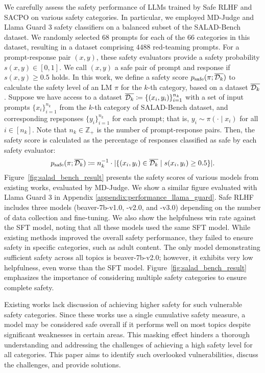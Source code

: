 We carefully assess the safety performance of LLMs trained by Safe RLHF and SACPO on various safety categories. In particular, we employed MD-Judge and Llama Guard 3 safety classifiers on a balanced subset of the SALAD-Bench dataset. We randomly selected $68$ prompts for each of the $66$ categories in this dataset, resulting in a dataset comprising $4488$ red-teaming prompts. For a prompt-response pair $(x, y)$, these safety evaluators provide a safety probability $s(x, y) \in [0, 1]$.
We call $(x, y)$ a safe pair of prompt and response if $s(x, y) \ge 0.5$ holds.
In this work, we define a safety score $p_\text{safe}(\pi; \overline{\mathcal{D}_k})$ to calculate the safety level of an LM $\pi$ for the $k$-th category, based on a dataset $\overline{\mathcal{D}_k}$.
Suppose we have access to a dataset $\overline{\mathcal{D}_k} \coloneqq \{(x_i, y_i)\}_{i=1}^{n_k}$ with a set of input prompts $\{x_i\}_{i=1}^{n_k}$ from the $k$-th category of SALAD-Bench dataset, and corresponding repsponses $\{y_i\}_{i=1}^{n_k}$ for each prompt; that is, $y_i \sim \pi(\cdot \mid x_i)$ for all $i \in [n_k]$.
Note that $n_k \in \mathbb{Z}_+$ is the number of prompt-response pairs.
Then, the safety score is calculated as the percentage of responses classified as safe by each safety evaluator:
%
\begin{equation*}
    p_\text{safe}(\pi; \overline{\mathcal{D}_k}) \coloneqq n_k^{-1} \cdot |\{(x_i, y_i) \in \overline{\mathcal{D}_k} \mid s(x_i, y_i) \ge 0.5\}|.
\end{equation*}
%
Figure~\ref{fig:salad_bench_result} presents the safety scores of various models from existing works, evaluated by MD-Judge. We show a similar figure evaluated with Llama Guard 3 in Appendix \ref{appendix:performance_llama_guard}. Safe RLHF includes three models (beaver-7b-v1.0, -v2.0, and -v3.0) depending on the number of data collection and fine-tuning. We also show the helpfulness win rate against the SFT model, noting that all these models used the same SFT model. While existing methods improved the overall safety performance, they failed to ensure safety in specific categories, such as adult content. The only model demonstrating sufficient safety across all topics is beaver-7b-v2.0; however, it exhibits very low helpfulness, even worse than the SFT model. Figure~\ref{fig:salad_bench_result} emphasizes the importance of considering multiple safety categories to ensure complete safety.

Existing works lack discussion of achieving higher safety for such vulnerable safety categories. Since these works use a single cumulative safety measure, a model may be considered safe overall if it performs well on most topics despite significant weaknesses in certain areas. This masking effect hinders a thorough understanding and addressing the challenges of achieving a high safety level for all categories.
This paper aims to identify such overlooked vulnerabilities, discuss the challenges, and provide solutions.

